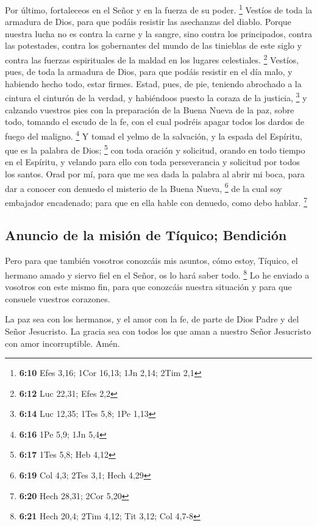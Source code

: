  Por último, fortaleceos en el Señor y en la fuerza de su
poder. \footnote{\textbf{6:10} Efes 3,16; 1Cor 16,13; 1Jn 2,14; 2Tim 2,1}
 Vestíos de toda la armadura de Dios, para que podáis
resistir las asechanzas del diablo.  Porque nuestra lucha
no es contra la carne y la sangre, sino contra los principados, contra
las potestades, contra los gobernantes del mundo de las tinieblas de
este siglo y contra las fuerzas espirituales de la maldad en los lugares
celestiales. \footnote{\textbf{6:12} Luc 22,31; Efes 2,2}
 Vestíos, pues, de toda la armadura de Dios, para que
podáis resistir en el día malo, y habiendo hecho todo, estar firmes.
 Estad, pues, de pie, teniendo abrochado a la cintura el
cinturón de la verdad, y habiéndoos puesto la coraza de la justicia,
\footnote{\textbf{6:14} Luc 12,35; 1Tes 5,8; 1Pe 1,13}  y
calzando vuestros pies con la preparación de la Buena Nueva de la paz,
 sobre todo, tomando el escudo de la fe, con el cual
podréis apagar todos los dardos de fuego del maligno. \footnote{\textbf{6:16}
  1Pe 5,9; 1Jn 5,4}  Y tomad el yelmo de la salvación, y
la espada del Espíritu, que es la palabra de Dios; \footnote{\textbf{6:17}
  1Tes 5,8; Heb 4,12}  con toda oración y solicitud,
orando en todo tiempo en el Espíritu, y velando para ello con toda
perseverancia y solicitud por todos los santos.  Orad por
mí, para que me sea dada la palabra al abrir mi boca, para dar a conocer
con denuedo el misterio de la Buena Nueva, \footnote{\textbf{6:19} Col
  4,3; 2Tes 3,1; Hech 4,29}  de la cual soy embajador
encadenado; para que en ella hable con denuedo, como debo hablar.
\footnote{\textbf{6:20} Hech 28,31; 2Cor 5,20}

\hypertarget{anuncio-de-la-misiuxf3n-de-tuxedquico-bendiciuxf3n}{%
\subsection{Anuncio de la misión de Tíquico;
Bendición}\label{anuncio-de-la-misiuxf3n-de-tuxedquico-bendiciuxf3n}}

 Pero para que también vosotros conozcáis mis asuntos,
cómo estoy, Tíquico, el hermano amado y siervo fiel en el Señor, os lo
hará saber todo. \footnote{\textbf{6:21} Hech 20,4; 2Tim 4,12; Tit 3,12;
  Col 4,7-8}  Lo he enviado a vosotros con este mismo
fin, para que conozcáis nuestra situación y para que consuele vuestros
corazones.

 La paz sea con los hermanos, y el amor con la fe, de
parte de Dios Padre y del Señor Jesucristo.  La gracia
sea con todos los que aman a nuestro Señor Jesucristo con amor
incorruptible. Amén.
